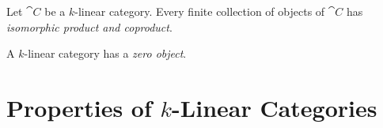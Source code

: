 \begin{corollary}
    \label{cor:k-linear-cat-finite-coprod-prod-are-iso}
    Let \(\cat C\) be a \(k\)-linear category. Every finite collection of objects of
    \(\cat C\) has \emph{isomorphic product and coproduct}.
\end{corollary}

\begin{corollary}
    \label{cor:k-linear-category-has-zero-object}
    A \(k\)-linear category has a \emph{zero object}.
\end{corollary}

\section{Properties of \texorpdfstring{\(k\)}{k}-Linear Categories}

